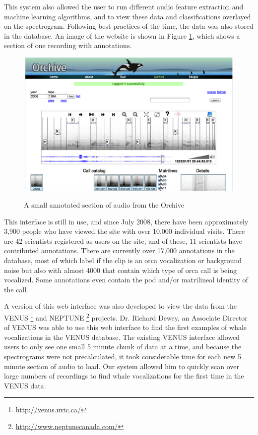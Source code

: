 \documentclass[12pt,oneside]{book}
\begin{document}
This system also allowed the user to run different audio feature
extraction and machine learning algorithms, and to view these data and
classifications overlayed on the spectrogram.  Following best
practices of the time, the data was also stored in the database.  An
image of the website is shown in Figure \ref{fig:dm_orchive}, which
shows a section of one recording with annotations.

\begin{figure}[t]
\centering
\includegraphics[width=\columnwidth]{figures/dm_orchive}
\label{fig:dm_orchive}
\caption{A small annotated section of audio from the Orchive}
\end{figure}

This interface is still in use, and since July 2008, there have been
approximately 3,900 people who have viewed the site with over 10,000
individual visits.  There are 42 scientists registered as users on the
site, and of these, 11 scientists have contributed annotations.  There
are currently over 17,000 annotations in the database, most of which
label if the clip is an orca vocalization or background noise but also
with almost 4000 that contain which type of orca call is being
vocalized.  Some annotations even contain the pod and/or matrilineal
identity of the call.

A version of this web interface was also developed to view the data
from the VENUS \footnote{\url{http://venus.uvic.ca/}} and
NEPTUNE \footnote{\url{http://www.neptunecanada.com/}} projects.
Dr. Richard Dewey, an Associate Director of VENUS was able to use this
web interface to find the first examples of whale vocalizations in the
VENUS database.  The existing VENUS interface allowed users to only
see one small 5 minute chunk of data at a time, and because the
spectrograms were not precalculated, it took considerable time for
each new 5 minute section of audio to load.  Our system allowed him to
quickly scan over large numbers of recordings to find whale
vocalizations for the first time in the VENUS data.
\end{document}
